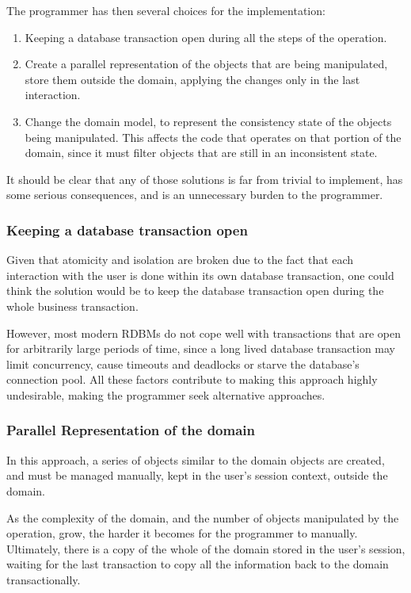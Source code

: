 \documentclass{llncs}
\begin{document}
The programmer has then several choices for the implementation:

\begin{enumerate}
\item Keeping a database transaction open during all the steps of the
  operation.

\item Create a parallel representation of the objects that are being
  manipulated, store them outside the domain, applying the changes
  only in the last interaction.

\item Change the domain model, to represent the consistency state of
  the objects being manipulated. This affects the code that operates
  on that portion of the domain, since it must filter objects that are
  still in an inconsistent state.
\end{enumerate}

It should be clear that any of those solutions is far from trivial to
implement, has some serious consequences, and is an unnecessary burden
to the programmer.

\subsubsection{Keeping a database transaction open}

Given that atomicity and isolation are broken due to the fact that
each interaction with the user is done within its own database
transaction, one could think the solution would be to keep the
database transaction open during the whole business transaction.

However, most modern RDBMs do not cope well with transactions that are
open for arbitrarily large periods of time, since a long lived
database transaction may limit concurrency, cause timeouts and
deadlocks or starve the database's connection pool. All these factors
contribute to making this approach highly undesirable, making the
programmer seek alternative approaches.

\subsubsection{Parallel Representation of the domain}

In this approach, a series of objects similar to the domain objects
are created, and must be managed manually, kept in the user's session
context, outside the domain.

As the complexity of the domain, and the number of objects manipulated
by the operation, grow, the harder it becomes for the programmer to
manually. Ultimately, there is a copy of the whole of the domain
stored in the user's session, waiting for the last transaction to copy
all the information back to the domain transactionally.
\end{document}
